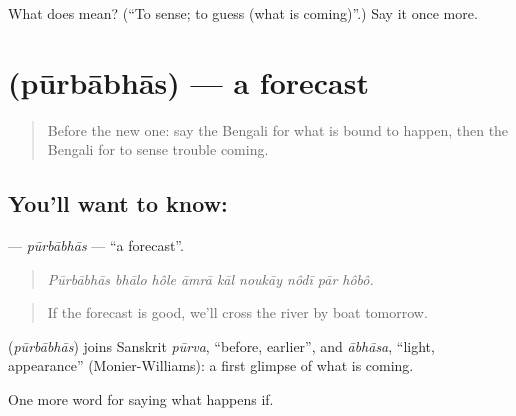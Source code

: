 \begin{tcolorbox}[breakable,colback=teal!4,colframe=teal!35!black,title={Before you move on}]
What does   mean? (\textquotedblleft{}To sense; to guess (what is coming)\textquotedblright{}.) Say it once more.
\end{tcolorbox}
\section[\texorpdfstring{\bn{পূর্বাভাস} (pūrbābhās)}{পূর্বাভাস (pūrbābhās)}]{ (pūrbābhās) — a forecast}

\label{lesson:BN-C532-purbabhas}



\begin{quote}
Before the new one: say the Bengali for what is bound to happen, then the Bengali for to sense trouble coming.
\end{quote}

\subsection*{You'll want to know: }
\textbf{} — \emph{pūrbābhās} — \textquotedblleft{}a forecast\textquotedblright{}.

\begin{quote}
        
\end{quote}

\begin{quote}
\emph{Pūrbābhās bhālo hôle āmrā kāl noukāy nôdī pār hôbô.}
\end{quote}

\begin{quote}
If the forecast is good, we'll cross the river by boat tomorrow.
\end{quote}

\begin{cousinweb}
\textbf{} (\emph{pūrbābhās}) joins Sanskrit \emph{pūrva}, \textquotedblleft{}before, earlier\textquotedblright{}, and \emph{ābhāsa}, \textquotedblleft{}light, appearance\textquotedblright{} (Monier-Williams): a first glimpse of what is coming.
\end{cousinweb}

\begin{grammarlens}[title={What you've built}]
One more word for saying what happens if.
\end{grammarlens}

